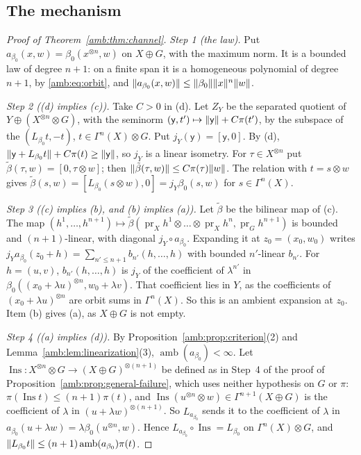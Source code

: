\subsection{The mechanism}\label{amb:ssec:proofs-mechanism}

\begin{proof}[Proof of Theorem~\ref{amb:thm:channel}]
\emph{Step 1 (the law).} Put $a_{\beta_0}(x,w)=\beta_0(x^{\otimes n},w)$ on $X\oplus G$, with the maximum norm. It is a bounded law of degree $n+1$: on a finite span it is a homogeneous polynomial of degree $n+1$, by \eqref{amb:eq:orbit}, and $\lVert a_{\beta_0}(x,w)\rVert\le\lVert \beta_0\rVert\lVert x\rVert^n\lVert w\rVert$.

\emph{Step 2 ((d) implies (c)).} Take $C>0$ in (d). Let $Z_Y$ be the separated quotient of $Y\oplus(X^{\otimes n}\otimes G)$, with the seminorm $(\mathsf y,t')\mapsto\lVert \mathsf y\rVert+C\pi(t')$, by the subspace of the $(L_{\beta_0}t,-t)$, $t\in\Gamma^n(X)\otimes G$. Put $j_Y(\mathsf y)=[\mathsf y,0]$. By (d), $\lVert \mathsf y+L_{\beta_0}t\rVert+C\pi(t)\ge\lVert \mathsf y\rVert$, so $j_Y$ is a linear isometry. For $\tau\in X^{\otimes n}$ put $\tilde\beta(\tau,w)=[0,\tau\otimes w]$; then $\lVert \tilde\beta(\tau,w)\rVert\le C\pi(\tau)\lVert w\rVert$. The relation with $t=s\otimes w$ gives $\tilde\beta(s,w)=[L_{\beta_0}(s\otimes w),0]=j_Y\beta_0(s,w)$ for $s\in\Gamma^n(X)$.

\emph{Step 3 ((c) implies (b), and (b) implies (a)).} Let $\tilde\beta$ be the bilinear map of (c). The map $(h^1,\dots,h^{n+1})\mapsto\tilde\beta(\operatorname{pr}_Xh^1\otimes\dots\otimes\operatorname{pr}_Xh^n,\operatorname{pr}_Gh^{n+1})$ is bounded and $(n+1)$-linear, with diagonal $j_Y\circ a_{\beta_0}$. Expanding it at $z_0=(x_0,w_0)$ writes $j_Ya_{\beta_0}(z_0+h)=\sum_{n'\le n+1}b_{n'}(h,\dots,h)$ with bounded $n'$-linear $b_{n'}$. For $h=(u,v)$, $b_{n'}(h,\dots,h)$ is $j_Y$ of the coefficient of $\lambda^{n'}$ in $\beta_0((x_0+\lambda u)^{\otimes n},w_0+\lambda v)$. That coefficient lies in $Y$, as the coefficients of $(x_0+\lambda u)^{\otimes n}$ are orbit sums in $\Gamma^n(X)$. So this is an ambient expansion at $z_0$. Item (b) gives (a), as $X\oplus G$ is not empty.

\emph{Step 4 ((a) implies (d)).} By Proposition~\ref{amb:prop:criterion}(2) and Lemma~\ref{amb:lem:linearization}(3), $\operatorname{amb}(a_{\beta_0})<\infty$. Let $\operatorname{Ins}\colon X^{\otimes n}\otimes G\to(X\oplus G)^{\otimes(n+1)}$ be defined as in Step~4 of the proof of Proposition~\ref{amb:prop:general-failure}, which uses neither hypothesis on $G$ or $\pi$: $\pi(\operatorname{Ins}t)\le(n+1)\pi(t)$, and $\operatorname{Ins}(u^{\otimes n}\otimes w)\in\Gamma^{n+1}(X\oplus G)$ is the coefficient of $\lambda$ in $(u+\lambda w)^{\otimes(n+1)}$. So $L_{a_{\beta_0}}$ sends it to the coefficient of $\lambda$ in $a_{\beta_0}(u+\lambda w)=\lambda\beta_0(u^{\otimes n},w)$. Hence $L_{a_{\beta_0}}\circ\operatorname{Ins}=L_{\beta_0}$ on $\Gamma^n(X)\otimes G$, and $\lVert L_{\beta_0}t\rVert\le(n+1)\operatorname{amb}(a_{\beta_0})\pi(t)$.


\end{proof}
